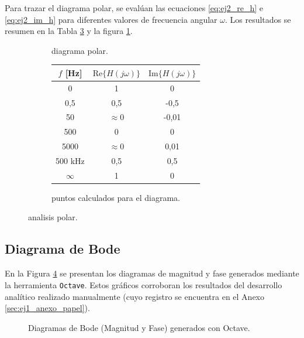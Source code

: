 Para trazar el diagrama polar, se evalúan las ecuaciones \ref{eq:ej2_re_h} e \ref{eq:ej2_im_h} para diferentes valores de
frecuencia angular $\omega$. Los resultados se resumen en la Tabla \ref{tab:ej2_puntos_polar} y la figura
\ref{fig:ej2_polar}.

\begin{figure}[!ht]
    \centering
    \begin{subfigure}[c]{0.45\textwidth}
        \centering
        \resizebox{\textwidth}{!}{
            
        }
        \caption{diagrama polar.}
        \label{fig:ej2_polar}
    \end{subfigure}
    \hfill
    \begin{subfigure}[c]{0.45\textwidth}
        \centering
        \begin{tabular}{|c|c|c|}
            \hline
            $f$ [\si{\hertz}] & $\text{Re}\{H(j\omega)\}$ & $\text{Im}\{H(j\omega)\}$ \\ \hline
            0 & 1 & 0 \\ \hline
            0,5 & 0,5 & -0,5 \\ \hline
            50 & $\approx 0$ & -0,01 \\ \hline
            500 & 0 & 0 \\ \hline
            5000 & $\approx 0$ & 0,01 \\ \hline
            500 \si{\kilo\hertz} & 0,5 & 0,5 \\ \hline
            $\infty$ & 1 & 0 \\ \hline
        \end{tabular}
        \caption{puntos calculados para el diagrama.}
        \label{tab:ej2_puntos_polar}
    \end{subfigure}
    \caption{analisis polar.}
\end{figure}

\subsection{Diagrama de Bode}

En la Figura \ref{fig:ej2_bode_octave} se presentan los diagramas de magnitud y fase generados mediante la herramienta
\texttt{Octave}. Estos gráficos corroboran los resultados
del desarrollo analítico realizado manualmente (cuyo registro se encuentra en el Anexo \ref{sec:ej1_anexo_papel}).

\begin{figure}[!ht]
    \centering
    \begin{subfigure}[t]{\textwidth}
        \centering
        \resizebox{\textwidth}{!}{%
        }
    \end{subfigure}
    \begin{subfigure}[t]{\textwidth}
        \centering
        \vspace{-0.5cm}
        \resizebox{\textwidth}{!}{%
        }
    \end{subfigure}
    \caption{Diagramas de Bode (Magnitud y Fase) generados con Octave.}
    \label{fig:ej2_bode_octave}
\end{figure}

